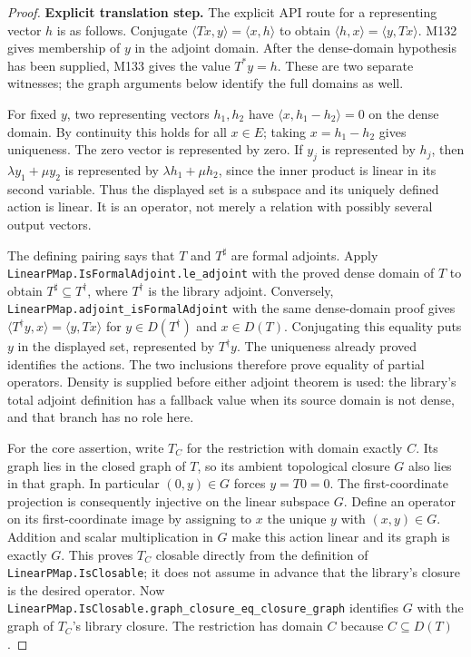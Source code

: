\documentclass[11pt,a4paper]{article}
\theoremstyle{definition}
\theoremstyle{remark}
\begin{document}
\begin{proof}
\noindent\textbf{Explicit translation step.} The explicit API route for a representing vector $h$ is as follows.
Conjugate $\langle Tx,y\rangle=\langle x,h\rangle$ to obtain
$\langle h,x\rangle=\langle y,Tx\rangle$. M132 gives membership of $y$
in the adjoint domain. After the dense-domain hypothesis has been
supplied, M133 gives the value $T^*y=h$. These are two separate witnesses;
the graph arguments below identify the full domains as well.

For fixed $y$, two representing vectors $h_1,h_2$ have
$\langle x,h_1-h_2\rangle=0$ on the dense domain. By continuity this
holds for all $x\in E$; taking $x=h_1-h_2$ gives uniqueness.
The zero vector is represented by zero. If $y_j$ is represented by
$h_j$, then $\lambda y_1+\mu y_2$ is represented by
$\lambda h_1+\mu h_2$, since the inner product is linear in its
second variable. Thus the displayed set is a subspace and its
uniquely defined action is linear. It is an operator, not merely a
relation with possibly several output vectors.

The defining pairing says that $T$ and $T^\sharp$ are formal
adjoints. Apply \nolinkurl{LinearPMap.IsFormalAdjoint.le_adjoint}
with the proved dense domain of $T$ to obtain
$T^\sharp\subseteq T^\dagger$, where $T^\dagger$ is the library
adjoint. Conversely,
\nolinkurl{LinearPMap.adjoint_isFormalAdjoint} with the same dense-domain
proof gives
$\langle T^\dagger y,x\rangle=\langle y,Tx\rangle$ for
$y\in D(T^\dagger)$ and $x\in D(T)$. Conjugating this equality
puts $y$ in the displayed set, represented by $T^\dagger y$.
The uniqueness already proved identifies the actions. The two
inclusions therefore prove equality of partial operators. Density
is supplied before either adjoint theorem is used: the library's
total adjoint definition has a fallback value when its source domain
is not dense, and that branch has no role here.

For the core assertion, write $T_C$ for the restriction with domain
exactly $C$. Its graph lies in the closed graph of $T$, so its
ambient topological closure $G$ also lies in that graph. In
particular $(0,y)\in G$ forces $y=T0=0$. The first-coordinate
projection is consequently injective on the linear subspace $G$.
Define an operator on its first-coordinate image by assigning to
$x$ the unique $y$ with $(x,y)\in G$. Addition and scalar
multiplication in $G$ make this action linear and its graph is
exactly $G$. This proves $T_C$ closable directly from the definition
of \nolinkurl{LinearPMap.IsClosable}; it does not assume in advance
that the library's closure is the desired operator.
Now \nolinkurl{LinearPMap.IsClosable.graph_closure_eq_closure_graph}
identifies $G$ with the graph of $T_C$'s library closure. The
restriction has domain $C$ because $C\subseteq D(T)$.


\end{proof}
\end{document}
